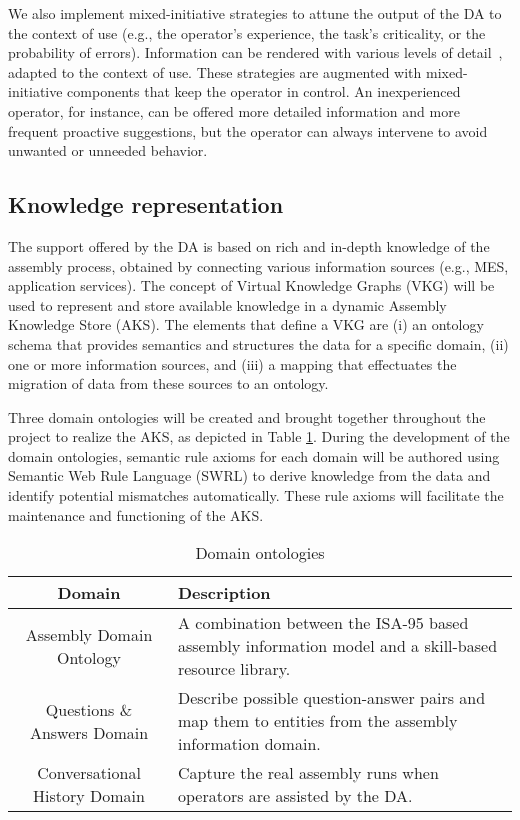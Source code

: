 We also implement mixed-initiative strategies to attune the output of the DA to the context of use (e.g., the operator's experience, the task's criticality, or the probability of errors). Information can be rendered with various levels of detail~\cite{Mezhoudi2015AnAA,10.1145/3332165.3347945}, adapted to the context of use. These strategies are augmented with mixed-initiative components that keep the operator in control. An inexperienced operator, for instance, can be offered more detailed information and more frequent proactive suggestions, but the operator can always intervene to avoid unwanted or unneeded behavior.

\subsection{Knowledge representation}
The support offered by the DA is based on rich and in-depth knowledge of the assembly process, obtained by connecting various information sources (e.g., MES, application services). The concept of Virtual Knowledge Graphs (VKG) \cite{xiao2019VirtualKnowledgeGraphs} will be used to represent and store available knowledge in a dynamic Assembly Knowledge Store (AKS). The elements that define a VKG are (i) an ontology schema that provides semantics and structures the data for a specific domain, (ii) one or more information sources, and (iii) a mapping that effectuates the migration of data from these sources to an ontology. 

Three domain ontologies will be created and brought together throughout the project to realize the AKS, as depicted in Table \ref{tab:ontolgoies}. During the development of the domain ontologies, semantic rule axioms \cite{sormaz2019SIMPMUpperlevelOntology} for each domain will be authored using Semantic Web Rule Language (SWRL) to derive knowledge from the data and identify potential mismatches automatically. These rule axioms will facilitate the maintenance and functioning of the AKS.

\begin{table}
  \caption{Domain ontologies}
  \label{tab:ontolgoies}
  \begin{tabular}{cp{7cm}}
    \toprule
    Domain & Description\\
    \midrule
    Assembly Domain Ontology &  A combination between the ISA-95 based assembly information model \cite{claeys2018OntologicalModelManaging} and a skill-based resource library.\\ 
    Questions \& Answers Domain & Describe possible question-answer pairs and map them to entities from the assembly information domain. \\
    Conversational History Domain & Capture the real assembly runs when operators are assisted by the DA.\\
    \bottomrule
  \end{tabular}
\end{table}

